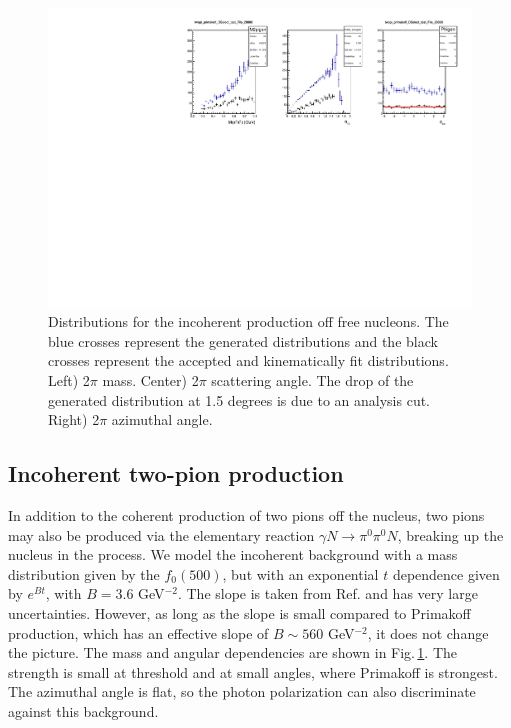 \begin{figure}[tbp]
\begin{center}
\includegraphics[width=16cm,clip=true]{figures/twopi_primakoff_DSelect_test_File_20000_IC.pdf}
\caption{Distributions for the incoherent production off free nucleons. The blue crosses represent the generated distributions and the black crosses represent the accepted and kinematically fit distributions.
Left) 2$\pi$ mass. Center) 2$\pi$ scattering angle. The drop of the generated distribution at 1.5 degrees is due to an analysis cut. Right) 2$\pi$ azimuthal angle.
\label{fig:IC}}
\end{center} 
\end{figure}

\subsection{Incoherent two-pion production}
In addition to the coherent production of two pions off the nucleus, two pions may also be produced via the elementary reaction $\gamma N\to \pi^0 \pi^0 N$, breaking up the nucleus in the process. We model the incoherent background with a mass distribution given by the $f_0(500)$, but with an exponential $t$ dependence given by $e^{Bt}$, with $B=3.6$ GeV$^{-2}$. The slope is taken from Ref.\cite{Battaglieri:2009aa} and has very large uncertainties. However, as long as the slope is small compared to Primakoff production, which has an effective slope of $B\sim560$ GeV$^{-2}$, it does not change the picture. The mass and angular dependencies are shown in Fig.\,\ref{fig:IC}. The strength is small at threshold and at small angles, where Primakoff is strongest. The azimuthal angle is flat, so the photon polarization can also discriminate against this background. 

